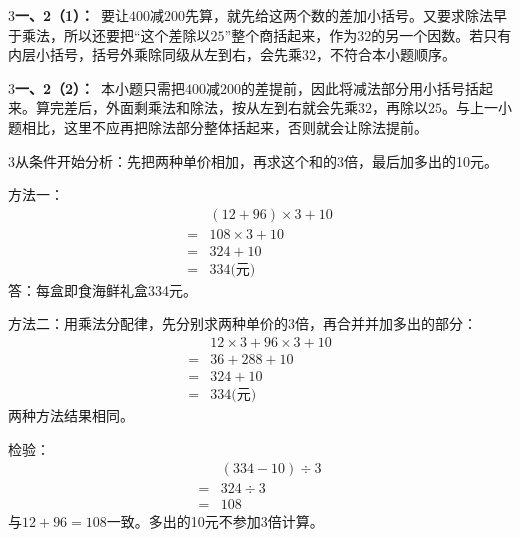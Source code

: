 \documentclass[multi=snippet,border={5bp 20bp 5bp 5bp}]{standalone}
\newenvironment{snippet}[3]{\begin{minipage}{#1bp}\color{answerred}\fontsize{#2}{#3}\selectfont\raggedright}{\end{minipage}}
\begin{document}
\begin{snippet}{505}{11.5}{14}\begin{multicols}{3}\raggedcolumns \textbf{一、2（1）：}\ 要让\(400\)\allowbreak 减\(200\)\allowbreak 先算，就先给这两个数的差加小括号。又要求除法早于乘法，所以还要把“这个差除以\(25\)\allowbreak ”整个商括起来，作为\(32\)\allowbreak 的另一个因数。若只有内层小括号，括号外乘除同级从左到右，会先乘\(32\)\allowbreak ，不符合本小题顺序。\end{multicols}\end{snippet}
\begin{snippet}{505}{11.5}{14}\begin{multicols}{3}\raggedcolumns \textbf{一、2（2）：}\ 本小题只需把\(400\)\allowbreak 减\(200\)\allowbreak 的差提前，因此将减法部分用小括号括起来。算完差后，外面剩乘法和除法，按从左到右就会先乘\(32\)\allowbreak ，再除以\(25\)\allowbreak 。与上一小题相比，这里不应再把除法部分整体括起来，否则就会让除法提前。\end{multicols}\end{snippet}
\begin{snippet}{505}{11.5}{14}\begin{multicols}{3}\raggedcolumns 从条件开始分析：先把两种单价相加，再求这个和的3倍，最后加多出的10元。\par 方法一：\[\begin{aligned}&(12+96)\times3+10\\={}&108\times3+10\\={}&324+10\\={}&334\text{(元)}\end{aligned}\]答：每盒即食海鲜礼盒334元。\par 方法二：用乘法分配律，先分别求两种单价的3倍，再合并并加多出的部分：\[\begin{aligned}&12\times3+96\times3+10\\={}&36+288+10\\={}&324+10\\={}&334\text{(元)}\end{aligned}\]两种方法结果相同。\par 检验：\[\begin{aligned}&(334-10)\div3\\={}&324\div3\\={}&108\end{aligned}\]与\(12+96=108\)\allowbreak 一致。多出的10元不参加3倍计算。\end{multicols}\end{snippet}
\end{document}
